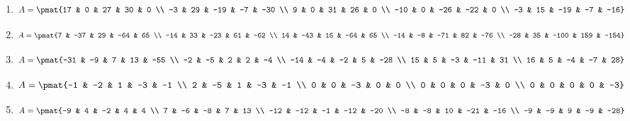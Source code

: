 \begin{enumerate}
\item

\begin{align*}
A = \pmat{17 & 0 & 27 & 30 & 0 \\ -3 & 29 & -19 & -7 & -30 \\ 9 & 0 & 31 & 26 & 0 \\ -10 & 0 & -26 & -22 & 0 \\ -3 & 15 & -19 & -7 & -16}
\end{align*}

\item

\begin{align*}
A = \pmat{7 & -37 & 29 & -64 & 65 \\ -14 & 33 & -23 & 61 & -62 \\ 14 & -43 & 16 & -64 & 65 \\ -14 & -8 & -71 & 82 & -76 \\ -28 & 35 & -100 & 159 & -154}
\end{align*}

\item

\begin{align*}
A = \pmat{-31 & -9 & 7 & 13 & -55 \\ -2 & -5 & 2 & 2 & -4 \\ -14 & -4 & -2 & 5 & -28 \\ 15 & 5 & -3 & -11 & 31 \\ 16 & 5 & -4 & -7 & 28}
\end{align*}

\item

\begin{align*}
A = \pmat{-1 & -2 & 1 & -3 & -1 \\ 2 & -5 & 1 & -3 & -1 \\ 0 & 0 & -3 & 0 & 0 \\ 0 & 0 & 0 & -3 & 0 \\ 0 & 0 & 0 & 0 & -3}
\end{align*}

\item

\begin{align*}
A = \pmat{-9 & 4 & -2 & 4 & 4 \\ 7 & -6 & -8 & 7 & 13 \\ -12 & -12 & -1 & -12 & -20 \\ -8 & -8 & 10 & -21 & -16 \\ -9 & -9 & 9 & -9 & -28}
\end{align*}


\end{enumerate}
